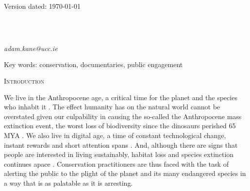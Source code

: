 \documentclass[12pt,letterpaper]{article}
\renewcommand{\section}[1]{%
\bigskip
\begin{center}
\begin{Large}
\normalfont\scshape #1
\medskip
\end{Large}
\end{center}}
\begin{document}
\begin{flushright}
Version dated: \today
\end{flushright}

\bigskip
\medskip
\begin{center}


\bigskip

\\
\\

\end{center}
\medskip
{} \textit{adam.kane@ucc.ie}\\  
\vspace{1in}

\modulolinenumbers[1]
\linenumbers

%
%
\begin{abstract}
\end{abstract}

\noindent Key words: conservation, documentaries, public engagement\\


%
%

\newpage 
\section{Introduction}
We live in the Anthropocene age, a critical time for the planet and the species who inhabit it \cite{rands2010biodiversity}. The effect humanity has on the natural world cannot be overstated given our culpability in causing the so-called the Anthropocene mass extinction event, the worst loss of biodiversity since the dinosaurs perished 65 MYA \cite{barnosky2011has}. We also live in digital age, a time of constant technological change, instant rewards and short attention spans \cite{owen2009internet}. And, although there are signs that people are interested in living sustainably, habitat loss and species extinction continues apace \cite{rands2010biodiversity}. Conservation practitioners are thus faced with the task of alerting the public to the plight of the planet and its many endangered species in a way that is as palatable as it is arresting. 
\end{document}
